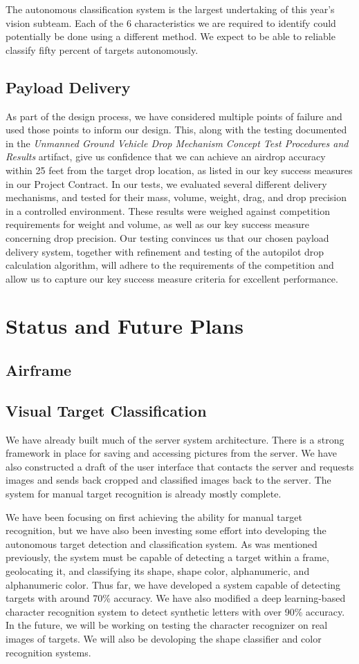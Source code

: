 \documentclass[]{auvsi_doc}
\begin{document}
The autonomous classification system is the largest undertaking of this year's vision subteam. Each of the 6 characteristics we are
required to identify could potentially be done using a different method. We expect to be able to reliable classify fifty percent of
targets autonomously.
\subsection{Payload Delivery}
As part of the design process, we have considered multiple points of failure and used those points to inform our design. This, along with the testing documented in the \textit{Unmanned Ground Vehicle Drop Mechanism Concept Test Procedures and Results} artifact, give us confidence that we can achieve an airdrop accuracy within 25 feet from the target drop location, as listed in our key success measures in our Project Contract. In our tests, we evaluated several different delivery mechanisms, and tested for their mass, volume, weight, drag, and drop precision in a controlled environment. These results were weighed against competition requirements for weight and volume, as well as our key success measure concerning drop precision. Our testing convinces us that our chosen payload delivery system, together with refinement and testing of the autopilot drop calculation algorithm, will adhere to the requirements of the competition and allow us to capture our key success measure criteria for excellent performance.
\section{Status and Future Plans}
\subsection{Airframe}
\subsection{Visual Target Classification}
We have already built much of the server system architecture. There is a strong framework in place for saving and accessing pictures
from the server. We have also constructed a draft of the user interface that contacts the server and requests images and sends back
cropped and classified images back to the server. The system for manual target recognition is already mostly complete.

We have been focusing on first achieving the ability for manual target recognition, but we have also been investing some effort into developing
the autonomous target detection and classification system. As was mentioned previously, the system must be capable of detecting a target
within a frame, geolocating it, and classifying its shape, shape color, alphanumeric, and alphanumeric color. Thus far, we have developed a
system capable of detecting targets with around 70\% accuracy. We have also modified a deep learning-based character recognition system
to detect synthetic letters with over 90\% accuracy. In the future, we will be working on testing the character recognizer on
real images of targets. We will also be devoloping the shape classifier and color recognition systems.
\end{document}
